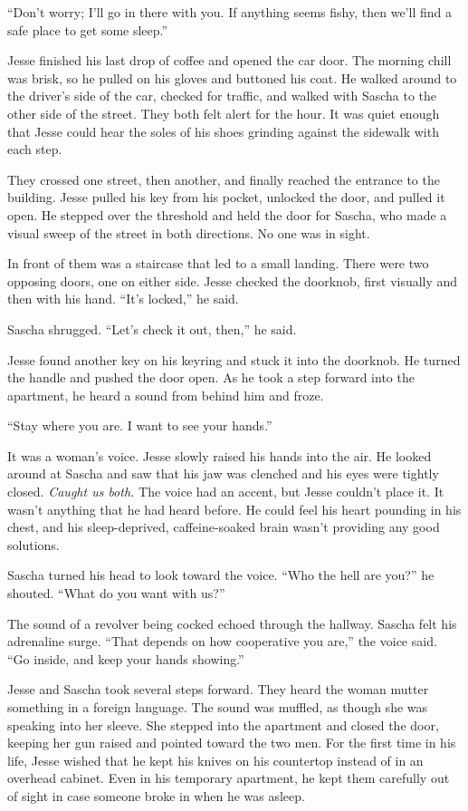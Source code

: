 \documentclass[12pt]{book}
\begin{document}
``Don't worry; I'll go in there with you.  If anything seems fishy, then we'll find a safe place to get some sleep.''

Jesse finished his last drop of coffee and opened the car door.  The morning chill was brisk, so he pulled on his gloves and buttoned his coat.  He walked around to the driver's side of the car, checked for traffic, and walked with Sascha to the other side of the street.  They both felt alert for the hour.  It was quiet enough that Jesse could hear the soles of his shoes grinding against the sidewalk with each step.

They crossed one street, then another, and finally reached the entrance to the building.  Jesse pulled his key from his pocket, unlocked the door, and pulled it open.  He stepped over the threshold and held the door for Sascha, who made a visual sweep of the street in both directions.  No one was in sight.

In front of them was a staircase that led to a small landing.  There were two opposing doors, one on either side.  Jesse checked the doorknob, first visually and then with his hand.  ``It's locked,'' he said.

Sascha shrugged.  ``Let's check it out, then,'' he said.

Jesse found another key on his keyring and stuck it into the doorknob.  He turned the handle and pushed the door open.  As he took a step forward into the apartment, he heard a sound from behind him and froze.

``Stay where you are.  I want to see your hands.''

It was a woman's voice.  Jesse slowly raised his hands into the air.  He looked around at Sascha and saw that his jaw was clenched and his eyes were tightly closed.  \emph{Caught us both.}  The voice had an accent, but Jesse couldn't place it.  It wasn't anything that he had heard before.  He could feel his heart pounding in his chest, and his sleep-deprived, caffeine-soaked brain wasn't providing any good solutions.

Sascha turned his head to look toward the voice.  ``Who the hell are you?'' he shouted.  ``What do you want with us?''

The sound of a revolver being cocked echoed through the hallway.  Sascha felt his adrenaline surge.  ``That depends on how cooperative you are,'' the voice said.  ``Go inside, and keep your hands showing.''

Jesse and Sascha took several steps forward.  They heard the woman mutter something in a foreign language.  The sound was muffled, as though she was speaking into her sleeve.  She stepped into the apartment and closed the door, keeping her gun raised and pointed toward the two men.  For the first time in his life, Jesse wished that he kept his knives on his countertop instead of in an overhead cabinet.  Even in his temporary apartment, he kept them carefully out of sight in case someone broke in when he was asleep.
\end{document}
